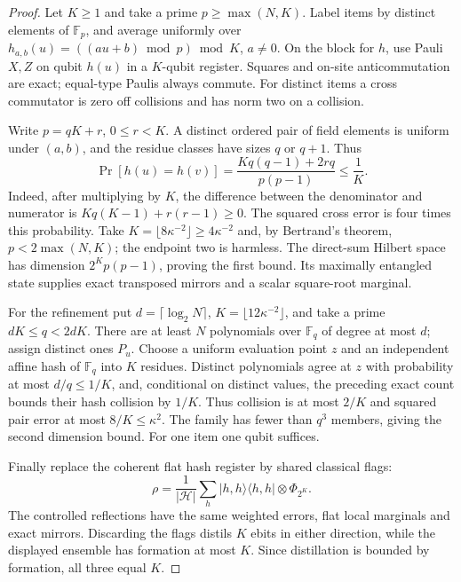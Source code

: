 \begin{proof}
Let $K\ge1$ and take a prime $p\ge\max(N,K)$. Label items by distinct elements of $\mathbb F_p$, and average uniformly over $h_{a,b}(u)=((au+b)\bmod p)\bmod K$, $a\ne0$. On the block for $h$, use Pauli $X,Z$ on qubit $h(u)$ in a $K$-qubit register. Squares and on-site anticommutation are exact; equal-type Paulis always commute. For distinct items a cross commutator is zero off collisions and has norm two on a collision.

Write $p=qK+r$, $0\le r<K$. A distinct ordered pair of field elements is uniform under $(a,b)$, and the residue classes have sizes $q$ or $q+1$. Thus
\[
 \Pr[h(u)=h(v)]=\frac{Kq(q-1)+2rq}{p(p-1)}\le\frac1K.
\]
Indeed, after multiplying by $K$, the difference between the denominator and numerator is $Kq(K-1)+r(r-1)\ge0$. The squared cross error is four times this probability. Take $K=\lfloor8\kappa^{-2}\rfloor\ge4\kappa^{-2}$ and, by Bertrand's theorem, $p<2\max(N,K)$; the endpoint two is harmless. The direct-sum Hilbert space has dimension $2^Kp(p-1)$, proving the first bound. Its maximally entangled state supplies exact transposed mirrors and a scalar square-root marginal.

For the refinement put $d=\lceil\log_2N\rceil$, $K=\lfloor12\kappa^{-2}\rfloor$, and take a prime $dK\le q<2dK$. There are at least $N$ polynomials over $\mathbb F_q$ of degree at most $d$; assign distinct ones $P_u$. Choose a uniform evaluation point $z$ and an independent affine hash of $\mathbb F_q$ into $K$ residues. Distinct polynomials agree at $z$ with probability at most $d/q\le1/K$, and, conditional on distinct values, the preceding exact count bounds their hash collision by $1/K$. Thus collision is at most $2/K$ and squared pair error at most $8/K\le\kappa^2$. The family has fewer than $q^3$ members, giving the second dimension bound. For one item one qubit suffices.

Finally replace the coherent flat hash register by shared classical flags:
\[
 \rho=\frac1{|\mathcal H|}\sum_h|h,h\rangle\langle h,h|\otimes\Phi_{2^K}.
\]
The controlled reflections have the same weighted errors, flat local marginals and exact mirrors. Discarding the flags distils $K$ ebits in either direction, while the displayed ensemble has formation at most $K$. Since distillation is bounded by formation, all three equal $K$.
\end{proof}


